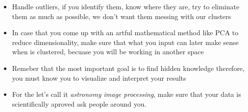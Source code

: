 \documentclass[11pt,fleqn]{book} %
\begin{document}
\begin{itemize}
																																																																																																																																																																																																										        \item Handle outliers, if you identify them, know where they are, try to eliminate them as much as possible, we don't want them messing with our clusters
																																																																																																																																																																																																											        \item In case that you come up with an artful mathematical method like PCA to reduce dimensionality, make sure that what you input can later make sense when is clustered, becuase you will be working in another space
																																																																																																																																																																																																												        \item Remeber that the most important goal is to find hidden knowledge therefore, you must know you to visualize and interpret your results
																																																																																																																																																																																																													        \item For the let's call it \emph{astronomy image processing}, make sure that your data is scientifically aproved ask people around you.
																																																																																																																																																																																																														    \end{itemize}

\end{document}
